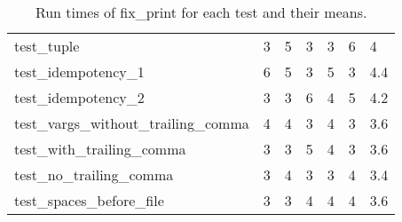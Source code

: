 \begin{table}[h!]
\begin{tabular}{@{}l|p{5em}p{5em}p{5em}p{5em}p{5em}p{5em}@{}}
    test\_tuple                           & 3                          & 5                          & 3                          & 3                          & 6                          & 4                                \\
    test\_idempotency\_1                  & 6                          & 5                          & 3                          & 5                          & 3                          & 4.4                              \\
    test\_idempotency\_2                  & 3                          & 3                          & 6                          & 4                          & 5                          & 4.2                              \\
    test\_vargs\_without\_trailing\_comma & 4                          & 4                          & 3                          & 4                          & 3                          & 3.6                              \\
    test\_with\_trailing\_comma           & 3                          & 3                          & 5                          & 4                          & 3                          & 3.6                              \\
    test\_no\_trailing\_comma             & 3                          & 4                          & 3                          & 3                          & 4                          & 3.4                              \\ 
    test\_spaces\_before\_file            & 3                          & 3                          & 4                          & 4                          & 4                          & 3.6                             \\ \bottomrule
    \end{tabular}
    \caption{Run times of fix\_print for each test and their means.}
    \label{table:fix_print-performance}
\end{table}